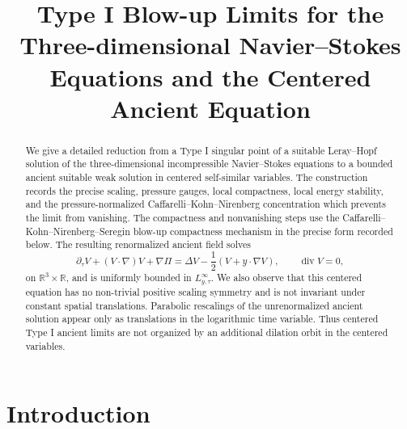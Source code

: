 \documentclass[11pt]{amsart}
\title[Type I blow-up limits for Navier--Stokes]{Type I Blow-up Limits for the Three-dimensional Navier--Stokes Equations and the Centered Ancient Equation}
\author{}
\date{}
\theoremstyle{plain}
\theoremstyle{definition}
\theoremstyle{remark}
\numberwithin{equation}{section}
\newcommand{\R}{\mathbb R}
\newcommand{\divergence}{\operatorname{div}}
\begin{document}
\begin{abstract}
We give a detailed reduction from a Type I singular point of a suitable
Leray--Hopf solution of the three-dimensional incompressible Navier--Stokes
equations to a bounded ancient suitable weak solution in centered self-similar
variables.  The construction records the precise scaling, pressure gauges,
local compactness, local energy stability, and the pressure-normalized
Caffarelli--Kohn--Nirenberg concentration which prevents the limit from
vanishing.  The compactness and nonvanishing steps use the
Caffarelli--Kohn--Nirenberg--Seregin blow-up compactness mechanism in the
precise form recorded below.  The resulting renormalized ancient field
solves
\[
   \partial_\tau V+(V\cdot\nabla)V+\nabla \Pi
   =\Delta V-\frac12(V+y\cdot\nabla V),\qquad \divergence V=0,
\]
on \(\R^3\times\R\), and is uniformly bounded in \(L^\infty_{y,\tau}\).  We
also observe that this centered equation has no non-trivial positive scaling
symmetry and is not invariant under constant spatial translations.  Parabolic
rescalings of the unrenormalized ancient solution appear only as translations
in the logarithmic time variable.  Thus centered Type I ancient limits are not
organized by an additional dilation orbit in the centered variables.
\end{abstract}

\maketitle

\section{Introduction}
\end{document}
